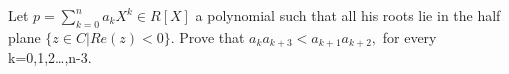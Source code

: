 Let \( p=\sum\limits_{k=0}^n a_kX^k\in R[X] \) a polynomial such that all his roots  lie in the half plane \( \{z\in C| Re(z)<0 \}. \) Prove that \( a_ka_{k+3}<a_{k+1}a_{k+2}, \) for every k=0,1,2\dots,n-3.